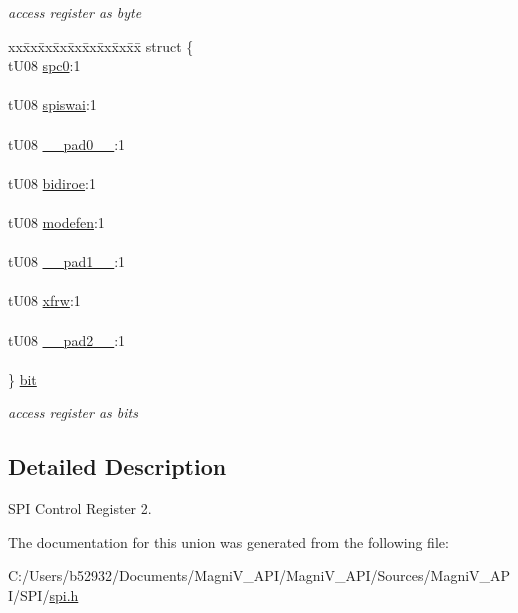 \begin{DoxyCompactItemize}
\begin{DoxyCompactList}\small\item\em access register as byte \end{DoxyCompactList}\item 
\hypertarget{unionu_s_p_i_c_r2_a2514855a0df9abe043c7f7dd6bdb8a9a}{}\begin{tabbing}
xx\=xx\=xx\=xx\=xx\=xx\=xx\=xx\=xx\=\kill
struct \{\\
\>tU08 \hyperlink{unionu_s_p_i_c_r2_aa5bfa288d055e63cd5db7adcdb861c94}{spc0}:1\\
\>\\
\>tU08 \hyperlink{unionu_s_p_i_c_r2_a1bc8b6d80ddcf682e17dedf5689823db}{spiswai}:1\\
\>\\
\>tU08 \hyperlink{unionu_s_p_i_c_r2_aa3e5250d311ceb1525f9adf38f0d7982}{\_\_pad0\_\_}:1\\
\>\\
\>tU08 \hyperlink{unionu_s_p_i_c_r2_a12e802706719c078903604331594a91e}{bidiroe}:1\\
\>\\
\>tU08 \hyperlink{unionu_s_p_i_c_r2_acc64bc21ac75a45157e248cb47615028}{modefen}:1\\
\>\\
\>tU08 \hyperlink{unionu_s_p_i_c_r2_a79a5f05caf4105fead38063726e0f288}{\_\_pad1\_\_}:1\\
\>\\
\>tU08 \hyperlink{unionu_s_p_i_c_r2_a88ee7588bdfe8dc1f0e11bec64885042}{xfrw}:1\\
\>\\
\>tU08 \hyperlink{unionu_s_p_i_c_r2_a87e10129d99cc39a4390436b0206df24}{\_\_pad2\_\_}:1\\
\>\\
\} \hyperlink{unionu_s_p_i_c_r2_a2514855a0df9abe043c7f7dd6bdb8a9a}{bit}\label{unionu_s_p_i_c_r2_a2514855a0df9abe043c7f7dd6bdb8a9a}
\\

\end{tabbing}\begin{DoxyCompactList}\small\item\em access register as bits \end{DoxyCompactList}\end{DoxyCompactItemize}


\subsection{Detailed Description}
S\+P\+I Control Register 2. 

The documentation for this union was generated from the following file\+:\begin{DoxyCompactItemize}
\item 
C\+:/\+Users/b52932/\+Documents/\+Magni\+V\+\_\+\+A\+P\+I/\+Magni\+V\+\_\+\+A\+P\+I/\+Sources/\+Magni\+V\+\_\+\+A\+P\+I/\+S\+P\+I/\hyperlink{spi_8h}{spi.\+h}\end{DoxyCompactItemize}
